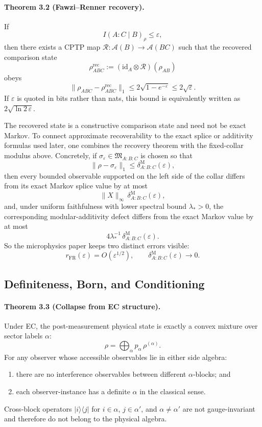 \paragraph{\textbf{Theorem 3.2 (Fawzi--Renner recovery).}}
If
\[
I(A:C\mid B)_\rho\le\varepsilon,
\]
then there exists a CPTP map \(\mathcal R:\mathcal A(B)\to\mathcal A(BC)\) such that the
recovered comparison state
\[
\rho^{\mathrm{rec}}_{ABC}
:=
(\mathrm{id}_A\otimes\mathcal R)(\rho_{AB})
\]
obeys
\[
\|\rho_{ABC}-\rho^{\mathrm{rec}}_{ABC}\|_1
\le
2\sqrt{1-e^{-\varepsilon}}
\le
2\sqrt{\varepsilon}.
\]
If \(\varepsilon\) is quoted in bits rather than nats, this bound is equivalently written as
\(2\sqrt{\ln 2\,\varepsilon}\).

The recovered state is a constructive comparison state and need not be exact Markov. To connect
approximate recoverability to the exact splice or additivity formulas used later, one combines the
recovery theorem with the fixed-collar modulus above. Concretely, if
\(\sigma_\varepsilon\in\mathfrak M_{A:B:C}\) is chosen so that
\[
\|\rho-\sigma_\varepsilon\|_1
\le
\delta^{\mathrm M}_{A:B:C}(\varepsilon),
\]
then every bounded observable supported on the left side of the collar differs from its exact
Markov splice value by at most
\[
\|X\|_\infty\,\delta^{\mathrm M}_{A:B:C}(\varepsilon),
\]
and, under uniform faithfulness with lower spectral bound \(\lambda_\ast>0\), the corresponding
modular-additivity defect differs from the exact Markov value by at most
\[
4\lambda_\ast^{-1}\,\delta^{\mathrm M}_{A:B:C}(\varepsilon).
\]
So the microphysics paper keeps two distinct errors visible:
\[
r_{\mathrm{FR}}(\varepsilon)=O(\varepsilon^{1/2}),
\qquad
\delta^{\mathrm M}_{A:B:C}(\varepsilon)\to0.
\]

\subsection{Definiteness, Born, and Conditioning}

\paragraph{\textbf{Theorem 3.3 (Collapse from EC structure).}}
Under EC, the post-measurement physical state is exactly a convex mixture over sector labels
\(\alpha\):
\[
\rho=\bigoplus_\alpha p_\alpha\,\rho^{(\alpha)}.
\]
For any observer whose accessible observables lie in either side algebra:
\begin{enumerate}[leftmargin=2em]
\item there are no interference observables between different \(\alpha\)-blocks; and
\item each observer-instance has a definite \(\alpha\) in the classical sense.
\end{enumerate}
Cross-block operators \(|i\rangle\langle j|\) for \(i\in\alpha\), \(j\in\alpha'\), and
\(\alpha\neq\alpha'\) are not gauge-invariant and therefore do not belong to the physical algebra.

